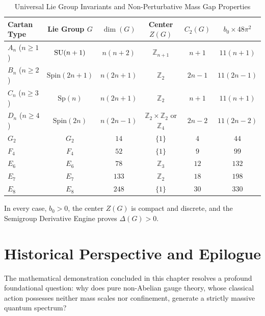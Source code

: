 \begin{table}[htbp]
\centering
\caption{Universal Lie Group Invariants and Non-Perturbative Mass Gap Properties}
\label{tab:cartan_killing_classification}
\begin{tabular}{lccccc}
\toprule
\textbf{Cartan Type} & \textbf{Lie Group $G$} & $\dim(G)$ & \textbf{Center $Z(G)$} & $C_2(G)$ & $b_0 \times 48\pi^2$ \\
\midrule
$A_n$ ($n \ge 1$) & $\mathrm{SU}(n+1)$ & $n(n+2)$ & $\mathbb{Z}_{n+1}$ & $n+1$ & $11(n+1)$ \\
$B_n$ ($n \ge 2$) & $\mathrm{Spin}(2n+1)$ & $n(2n+1)$ & $\mathbb{Z}_2$ & $2n-1$ & $11(2n-1)$ \\
$C_n$ ($n \ge 3$) & $\mathrm{Sp}(n)$ & $n(2n+1)$ & $\mathbb{Z}_2$ & $n+1$ & $11(n+1)$ \\
$D_n$ ($n \ge 4$) & $\mathrm{Spin}(2n)$ & $n(2n-1)$ & $\mathbb{Z}_2 \times \mathbb{Z}_2$ or $\mathbb{Z}_4$ & $2n-2$ & $11(2n-2)$ \\
$G_2$ & $G_2$ & $14$ & $\{1\}$ & $4$ & $44$ \\
$F_4$ & $F_4$ & $52$ & $\{1\}$ & $9$ & $99$ \\
$E_6$ & $E_6$ & $78$ & $\mathbb{Z}_3$ & $12$ & $132$ \\
$E_7$ & $E_7$ & $133$ & $\mathbb{Z}_2$ & $18$ & $198$ \\
$E_8$ & $E_8$ & $248$ & $\{1\}$ & $30$ & $330$ \\
\bottomrule
\end{tabular}
\end{table}

In every case, $b_0 > 0$, the center $Z(G)$ is compact and discrete, and the Semigroup Derivative Engine proves $\Delta(G) > 0$.

\section{Historical Perspective and Epilogue}
\label{sec:ch17_epilogue}

The mathematical demonstration concluded in this chapter resolves a profound foundational question: why does pure non-Abelian gauge theory, whose classical action possesses neither mass scales nor confinement, generate a strictly massive quantum spectrum?


